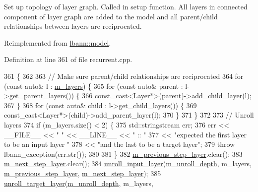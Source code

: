 Set up topology of layer graph. Called in setup function. All layers in connected component of layer graph are added to the model and all parent/child relationships between layers are reciprocated. 

Reimplemented from \hyperlink{classlbann_1_1model_a7b3e2a643c658dcaa7478d2568f29784}{lbann\+::model}.



Definition at line 361 of file recurrent.\+cpp.


\begin{DoxyCode}
361                                            \{
362   
363   \textcolor{comment}{// Make sure parent/child relationships are reciprocated}
364   \textcolor{keywordflow}{for} (\textcolor{keyword}{const} \textcolor{keyword}{auto}& l : \hyperlink{classlbann_1_1model_a0229fc226ec163d1411548446104569d}{m\_layers}) \{
365     \textcolor{keywordflow}{for} (\textcolor{keyword}{const} \textcolor{keyword}{auto}& parent : l->get\_parent\_layers()) \{
366       \textcolor{keyword}{const\_cast<}Layer*\textcolor{keyword}{>}(parent)->add\_child\_layer(l);
367     \}
368     \textcolor{keywordflow}{for} (\textcolor{keyword}{const} \textcolor{keyword}{auto}& child : l->get\_child\_layers()) \{
369       \textcolor{keyword}{const\_cast<}Layer*\textcolor{keyword}{>}(child)->add\_parent\_layer(l);
370     \}
371   \}
372 
373   \textcolor{comment}{// Unroll layers}
374   \textcolor{keywordflow}{if} (m\_layers.size() < 2) \{
375     std::stringstream err;
376     err << \_\_FILE\_\_ << \textcolor{stringliteral}{" "} << \_\_LINE\_\_ << \textcolor{stringliteral}{" :: "}
377         << \textcolor{stringliteral}{"expected the first layer to be an input layer "}
378         << \textcolor{stringliteral}{"and the last to be a target layer"};
379     \textcolor{keywordflow}{throw} lbann\_exception(err.str());
380 
381   \}
382   \hyperlink{classlbann_1_1recurrent__model_ac728773d3de0cefb9390231dc176dca4}{m\_previous\_step\_layer}.clear();
383   \hyperlink{classlbann_1_1recurrent__model_a426829f7fa36b112b4b91393c1657ddd}{m\_next\_step\_layer}.clear();
384   \hyperlink{namespacelbann_1_1anonymous__namespace_02recurrent_8cpp_03_a8c76387c2dd531058700ad9a41cd093a}{unroll\_input\_layer}(\hyperlink{classlbann_1_1recurrent__model_a71eb93ebf3411a5c170f6570c93e3cca}{m\_unroll\_depth}, m\_layers, 
      \hyperlink{classlbann_1_1recurrent__model_ac728773d3de0cefb9390231dc176dca4}{m\_previous\_step\_layer}, \hyperlink{classlbann_1_1recurrent__model_a426829f7fa36b112b4b91393c1657ddd}{m\_next\_step\_layer});
385   \hyperlink{namespacelbann_1_1anonymous__namespace_02recurrent_8cpp_03_af04adecd9a62fdcd16ae78b3e95d4bb5}{unroll\_target\_layer}(\hyperlink{classlbann_1_1recurrent__model_a71eb93ebf3411a5c170f6570c93e3cca}{m\_unroll\_depth}, m\_layers, 

\end{DoxyCode}
